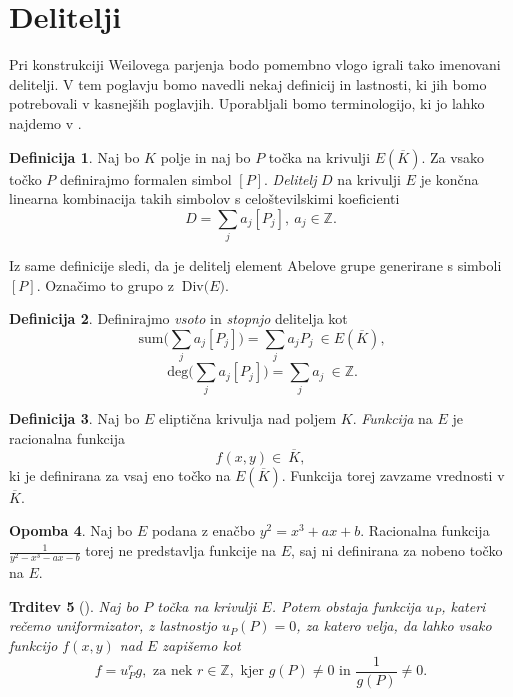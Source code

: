 \documentclass[12pt,a4paper,twoside]{article}
\theoremstyle{definition} %
\newtheorem{definicija}{Definicija}[section]
\newtheorem{opomba}[definicija]{Opomba}
\theoremstyle{plain} %
\newtheorem{trditev}[definicija]{Trditev}
\numberwithin{equation}{section}  %
\newcommand{\Z}{\mathbb Z}
\newcommand{\E}[1]{E({#1})}
\newcommand{\DIV}[1]{\ \text{Div(}{#1}\text{)}}
\newcommand{\DEG}[1]{\ \text{deg(}{#1}\text{)}}
\newcommand{\SUM}[1]{\ \text{sum(}{#1}\text{)}}
\begin{document}
\newpage


\section{Delitelji}

Pri konstrukciji Weilovega parjenja bodo pomembno vlogo igrali tako imenovani delitelji. V tem poglavju bomo navedli nekaj definicij in lastnosti, ki jih bomo potrebovali v kasnejših poglavjih. Uporabljali bomo terminologijo, ki jo lahko najdemo v \cite{Washington2008}.

\begin{definicija}
Naj bo $K$ polje in naj bo $P$ točka na krivulji $\E{\overline{K}}$. Za vsako točko $P$ definirajmo formalen simbol $[P]$. \emph{Delitelj} $D$ na krivulji $E$ je končna linearna kombinacija takih simbolov s celoštevilskimi koeficienti
$$D = \sum_{j}a_j[P_j], \ a_j \in \Z.$$

\end{definicija}

Iz same definicije sledi, da je delitelj element Abelove grupe generirane s simboli $[P]$. Označimo to grupo z $\DIV{E}$.


\begin{definicija}
Definirajmo \emph{vsoto} in \emph{stopnjo} delitelja kot
$$\SUM{\sum_{j}a_j[P_j]} = \sum_ja_jP_j \ \in \E{\overline{K}},$$
$$\DEG{\sum_{j}a_j[P_j]} = \sum_ja_j \ \in \Z.$$

\end{definicija}


\begin{definicija}
Naj bo $E$ eliptična krivulja nad poljem $K$. \emph{Funkcija} na $E$ je racionalna funkcija $$f(x,y) \in \ \overline{K},$$ ki je definirana za vsaj eno točko na $\E{\overline{K}}$. Funkcija torej zavzame vrednosti v $\overline{K}$.
\end{definicija}

\begin{opomba}
Naj bo $E$ podana z enačbo $y^2 = x^3+ax+b$. Racionalna funkcija $\frac{1}{y^2-x^3-ax-b}$ torej ne predstavlja funkcije na $E$, saj ni definirana za nobeno točko na $E$.

\end{opomba}

\begin{trditev}[]
\label{trd:red}
Naj bo $P$ točka na krivulji $E$. Potem obstaja funkcija $u_P$, kateri rečemo uniformizator, z lastnostjo $u_P(P) = 0$, za katero velja, da lahko vsako funkcijo $f(x,y)$ nad $E$ zapišemo kot
$$f = u^r_Pg, \text{ za nek } r\in \Z, \text{ kjer } g(P) \neq 0 \text{ in } \frac{1}{g(P)} \neq 0.$$
\end{trditev}
\end{document}

